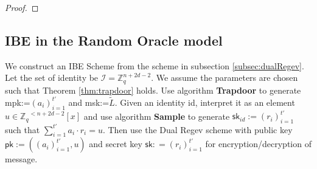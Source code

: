 \documentclass[11pt]{article}
\newcommand{\poly}[2]{{#1}^{<#2}[x]}
\newcommand{\Z}{\mathbb{Z}}
\newcommand{\sk}{\mathsf{sk}}
\newcommand{\pk}{\mathsf{pk}}
\begin{document}
\begin{proof}

\end{proof}
\subsection{IBE in the Random Oracle model} \label{subsec:IBE}
We construct an IBE Scheme from the scheme in subsection \ref{subsec:dualRegev}. %
Let the set of identity be $\mathcal{I} = \Z_q^{n+2d-2}.$ We assume the parameters are chosen such that Theorem \ref{thm:trapdoor} holds. Use algorithm \textbf{Trapdoor} to generate mpk:=$(a_i)_{i=1}^{t'}$ and msk:=$\tilde{L}.$ Given an identity id, interpret it as an element $u \in \poly{\Z_q}{n+2d-2}$ and use algorithm \textbf{Sample} to generate $\sk_{id}:=(r_i)_{i=1}^{t'}$ such that $\sum_{i=1}^{t'} a_i \cdot r_i = u.$ Then use the Dual Regev scheme with public key $\pk:=((a_i)_{i=1}^{t'}, u)$ and secret key $\sk: = (r_i)_{i=1}^{t'}$ for encryption/decryption of message.
\end{document}
